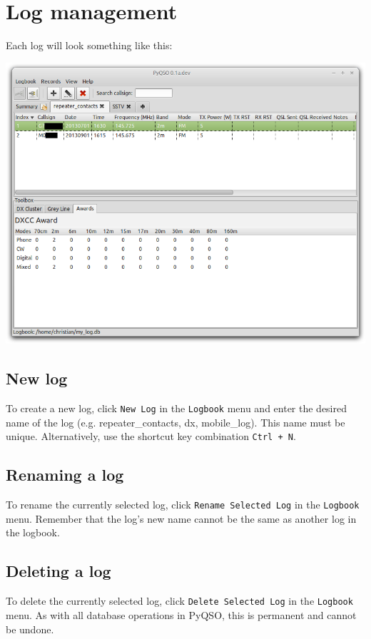 \documentclass[11pt, a4paper]{report}
\begin{document}
\chapter{Log management}\label{chap:log_management}
Each log will look something like this:
\begin{center}
  \includegraphics[width=1\columnwidth]{images/log_with_awards.png}
\end{center}

\section{New log}
To create a new log, click \texttt{New Log} in the \texttt{Logbook} menu and enter the desired name of the log (e.g. repeater\_contacts, dx, mobile\_log). This name must be unique. Alternatively, use the shortcut key combination \texttt{Ctrl + N}.

\section{Renaming a log}
To rename the currently selected log, click \texttt{Rename Selected Log} in the \texttt{Logbook} menu. Remember that the log's new name cannot be the same as another log in the logbook.

\section{Deleting a log}
To delete the currently selected log, click \texttt{Delete Selected Log} in the \texttt{Logbook} menu. As with all database operations in PyQSO, this is permanent and cannot be undone.
\end{document}

